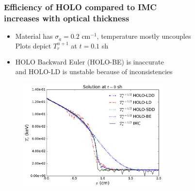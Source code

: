 \documentclass[xcolor=dvipsnames,hyperref={pdfpagelabels=false},unknownkeysallowed]{beamer}
\newcommand{\colG}[1]{{\color{Gray!110} #1}}
\newlength{\wideitemsep}
\let\olditem\item
\renewcommand{\item}{\setlength{\itemsep}{\wideitemsep}\olditem}
\begin{document}
\begin{frame}
    \frametitle{Efficiency of HOLO compared to IMC \\ increases with optical thickness}
    \fontsize{10.0pt}{10.0pt}\selectfont
    \vspace{0.1in}
    \begin{itemize}
        \item Material has $\sigma_a = 0.2$ cm$^{-1}$, temperature mostly uncouples  \\
            \colG{Plots depict $T_{r}^{n+1}$ at $t=0.1$ sh}
        \item HOLO Backward Euler (HOLO-BE) is inaccurate
            \\ \colG{and HOLO-LD is unstable because of inconsistencies}
    \end{itemize}
\begin{figure}[H]
  \centering
    \includegraphics[width=0.6790\textwidth]{thin_temp_compare.pdf}
\end{figure}
\end{frame}
\end{document}
